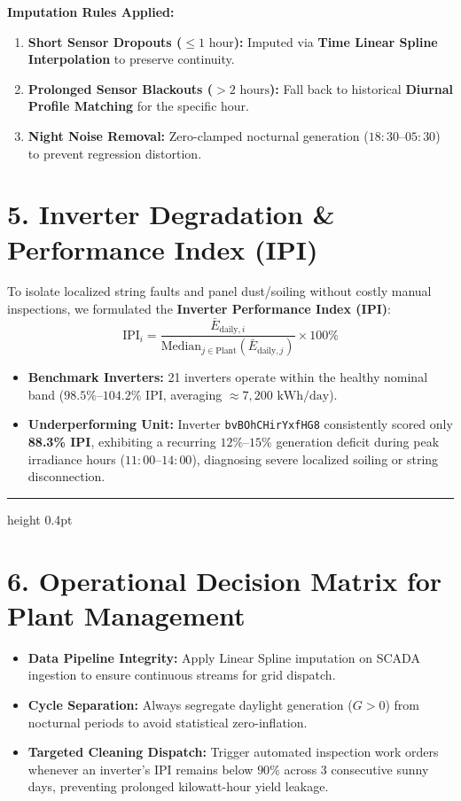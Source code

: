 \documentclass[10pt,a4paper]{article}
\begin{document}
\textbf{Imputation Rules Applied:}
\begin{enumerate}[leftmargin=14pt,itemsep=1.5pt,topsep=2pt,parsep=0pt]
    \item \textbf{Short Sensor Dropouts ($\le 1\text{ hour}$):} Imputed via \textbf{Time Linear Spline Interpolation} to preserve continuity.
    \item \textbf{Prolonged Sensor Blackouts ($> 2\text{ hours}$):} Fall back to historical \textbf{Diurnal Profile Matching} for the specific hour.
    \item \textbf{Night Noise Removal:} Zero-clamped nocturnal generation ($18:30\text{--}05:30$) to prevent regression distortion.
\end{enumerate}

\section*{5. Inverter Degradation \& Performance Index (IPI)}
To isolate localized string faults and panel dust/soiling without costly manual inspections, we formulated the \textbf{Inverter Performance Index (IPI)}:
\[
\text{IPI}_i = \frac{\bar{E}_{\text{daily}, i}}{\text{Median}_{j \in \text{Plant}}(\bar{E}_{\text{daily}, j})} \times 100\%
\]
\begin{itemize}[leftmargin=14pt,itemsep=1.5pt,topsep=2pt,parsep=0pt]
    \item \textbf{Benchmark Inverters:} 21 inverters operate within the healthy nominal band ($98.5\%\text{--}104.2\%$ IPI, averaging $\approx 7,200\text{ kWh/day}$).
    \item \textbf{Underperforming Unit:} Inverter \texttt{bvBOhCHirYxfHG8} consistently scored only \textbf{88.3\% IPI}, exhibiting a recurring $12\%\text{--}15\%$ generation deficit during peak irradiance hours ($11:00\text{--}14:00$), diagnosing severe localized soiling or string disconnection.
\end{itemize}

\vspace{3pt}
\hrule height 0.4pt
\vspace{4pt}

\section*{6. Operational Decision Matrix for Plant Management}
\begin{itemize}[leftmargin=14pt,itemsep=1.5pt,topsep=2pt,parsep=0pt]
    \item \textbf{Data Pipeline Integrity:} Apply Linear Spline imputation on SCADA ingestion to ensure continuous streams for grid dispatch.
    \item \textbf{Cycle Separation:} Always segregate daylight generation ($G > 0$) from nocturnal periods to avoid statistical zero-inflation.
    \item \textbf{Targeted Cleaning Dispatch:} Trigger automated inspection work orders whenever an inverter's IPI remains below $90\%$ across 3 consecutive sunny days, preventing prolonged kilowatt-hour yield leakage.
\end{itemize}
\end{document}
